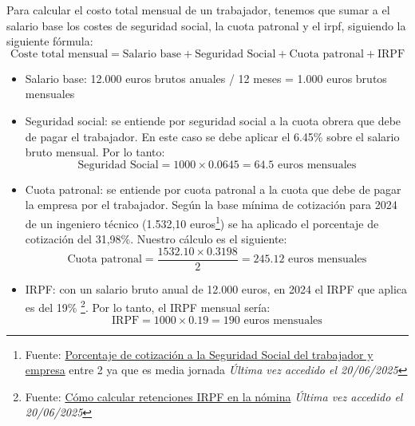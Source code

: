 Para calcular el costo total mensual de un trabajador, tenemos que sumar a el salario base los costes de seguridad social, la cuota patronal y el \acrshort{irpf}, siguiendo la siguiente fórmula:
\begin{equation}
    \text{Coste total mensual} = \text{Salario base} + \text{Seguridad Social} + \text{Cuota patronal} + \text{IRPF}
\end{equation}
\begin{itemize}
    \item Salario base: 12.000 euros brutos anuales / 12 meses = 1.000 euros brutos mensuales
    \item Seguridad social: se entiende por seguridad social a la cuota obrera que debe de pagar el trabajador. En este caso se debe aplicar el 6.45\% sobre el salario bruto mensual. Por lo tanto:
        \begin{equation}
            \text{Seguridad Social} = 1000 \times 0.0645 = 64.5 \text{ euros mensuales}
        \end{equation}
    \item Cuota patronal: se entiende por cuota patronal a la cuota que debe de pagar la empresa por el trabajador.
        Según la base mínima de cotización para 2024 de un ingeniero técnico (1.532,10 euros\footnote{Fuente: \href{https://www.cuestioneslaborales.es/porcentaje-de-cotizacion-a-la-seguridad-social-del-trabajador-y-empresa/}{Porcentaje de cotización a la Seguridad Social del trabajador y empresa} entre 2 ya que es media jornada\textit{ Última vez accedido el 20/06/2025 }}) se ha aplicado el porcentaje de cotización del 31,98\%.
        Nuestro cálculo es el siguiente:
        \begin{equation}
            \text{Cuota patronal} = \dfrac{1532.10 \times 0.3198}{2} = 245.12 \text{ euros mensuales}
        \end{equation}
    \item IRPF: con un salario bruto anual de 12.000 euros, en 2024 el IRPF que aplica es del 19\% \footnote{Fuente: \href{https://www.bankinter.com/blog/finanzas-personales/como-calcular-retenciones-irpf-nomina\#tabla-retenciones}{Cómo calcular retenciones IRPF en la nómina}\textit{ Última vez accedido el 20/06/2025 }}.
        Por lo tanto, el IRPF mensual sería:
        \begin{equation}
            \text{IRPF} = 1000 \times 0.19 = 190 \text{ euros mensuales}
        \end{equation}
\end{itemize}

